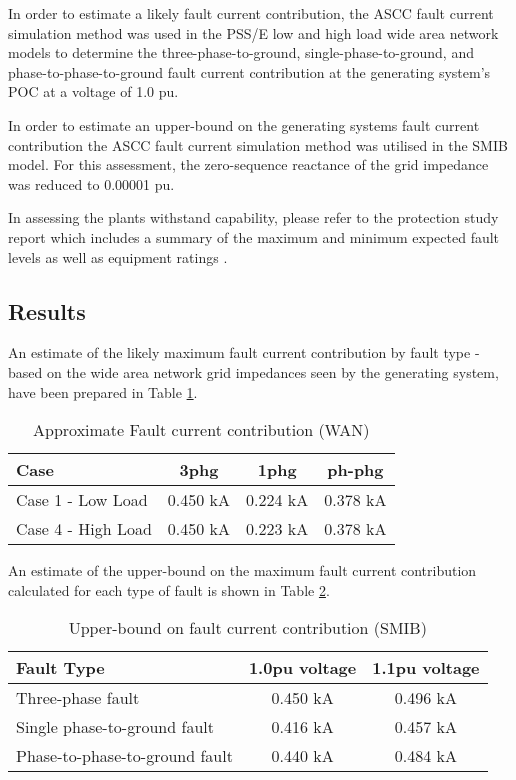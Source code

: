 \documentclass{../grid-link-report}
\begin{document}
	In order to estimate a likely fault current contribution, the ASCC fault current simulation method was used in the PSS/E low and high load wide area network models to determine the three-phase-to-ground, single-phase-to-ground, and phase-to-phase-to-ground fault current contribution at the generating system's POC at a voltage of 1.0 pu. 
	
	In order to estimate an upper-bound on the generating systems fault current contribution the ASCC fault current simulation method was utilised in the SMIB model. For this assessment, the zero-sequence reactance of the grid impedance was reduced to 0.00001 pu.
		
	In assessing the plants withstand capability, please refer to the protection study report which includes a summary of the maximum and minimum expected fault levels as well as equipment ratings \cite{protection-design-report}.
	
	\subsection{Results}
	An estimate of the likely maximum fault current contribution by fault type - based on the wide area network grid impedances seen by the generating system, have been prepared in Table \ref{tab:528-results}.

	\begin{table}[H]
	\centering
	\caption{Approximate Fault current contribution (WAN)}
	\label{tab:528-results}
	\begin{tabular}{|l|c|c|c|}
		\hline
		\textbf{Case} & \textbf{3phg}  & \textbf{1phg} & \textbf{ph-phg} \\
		\hline
		Case 1 - Low Load & 0.450 kA   & 0.224 kA & 0.378 kA\\
		\hline
		Case 4 - High Load & 0.450 kA  & 0.223 kA & 0.378 kA\\
		\hline
	\end{tabular}			
	\end{table}
	
	An estimate of the upper-bound on the maximum fault current contribution calculated for each type of fault is shown in Table \ref{tab:528-results-upperbound}.

	\begin{table}[H]
		\centering
		\caption{Upper-bound on fault current contribution (SMIB)}
		\label{tab:528-results-upperbound}
		\begin{tabular}{|l|c|c|}
			\hline
			\textbf{Fault Type} & \textbf{1.0pu voltage}  & \textbf{1.1pu voltage} \\
			\hline
			Three-phase fault 				& 0.450 kA 	& 0.496 kA \\
			\hline
			Single phase-to-ground fault 	& 0.416 kA 	& 0.457 kA  \\
			\hline
			Phase-to-phase-to-ground fault 	& 0.440 kA	&  0.484 kA \\
			\hline
		\end{tabular}			
	\end{table}
\end{document}
